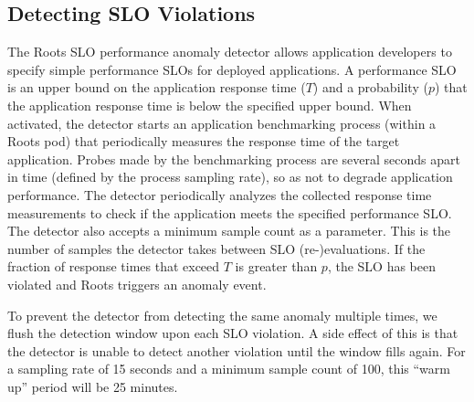 \subsection{Detecting SLO Violations}

The Roots SLO performance anomaly detector
allows application developers to specify simple performance SLOs for deployed applications. A
performance SLO is an upper bound on the application response time ($T$) and a probability ($p$)
that the application response time is below the specified upper bound. 
When activated, the detector starts an application benchmarking process (within a Roots pod)
that periodically measures the response time of the target application. Probes made by the benchmarking 
process are several seconds apart in time (defined by the process sampling rate), 
so as not to degrade application performance.
The detector periodically
analyzes the collected response time measurements to check if the application meets the specified performance
SLO. The detector also accepts a minimum sample count as a parameter. This is the number of 
samples the detector takes between SLO (re-)evaluations.  If the fraction of response times
that exceed $T$ is greater than $p$, the SLO has been violated and Roots triggers an anomaly event.

To prevent the detector from detecting the same anomaly multiple times, we flush
the detection window upon each SLO violation. A side effect of this is that 
the detector is unable to detect
another violation until the window fills again.
For a sampling rate of 15 seconds and a minimum
sample count of 100, this ``warm up'' period will be 25 minutes.

